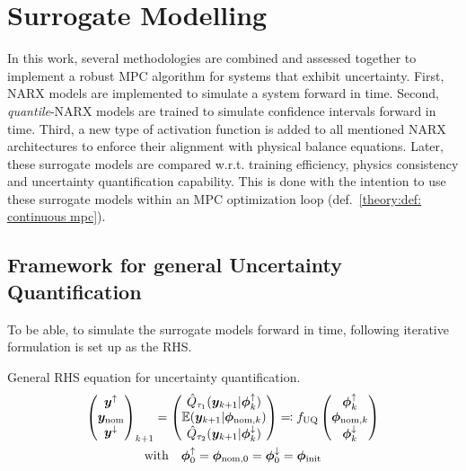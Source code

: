 \chapter{Surrogate Modelling}

In this work, several methodologies are combined and assessed together to implement a robust MPC algorithm
for systems that exhibit uncertainty. First, NARX models are implemented to simulate a system forward in time.
Second, \emph{quantile}-NARX models are trained to simulate confidence intervals forward in time. Third,
a new type of activation function is added to all mentioned NARX architectures to enforce their alignment
with physical balance equations. Later, these surrogate models are compared w.r.t. training efficiency,
physics consistency and uncertainty quantification capability. 
This is done with the intention to use these surrogate models within an MPC optimization
loop (def.~\ref{theory:def: continuous mpc}).

\section{Framework for general Uncertainty Quantification}
To be able, to simulate the surrogate models forward in time, following iterative formulation 
is set up as the RHS.
\begin{definition} General RHS equation for uncertainty quantification.
    \label{sur:def: general rhs for uncertainty quantification}
    \[  
    \begin{gathered}
        \begin{pmatrix}
            {\bm{y}}^\uparrow \\
            {\bm{y}}_\text{nom} \\
            {\bm{y}}^\downarrow
        \end{pmatrix}_{k+1}
        = \begin{pmatrix}
            \hat{Q}_{\tau_1}({\bm{y}}_{k+1} | \bm{\phi}^\uparrow_k) \\
            \mathbb{E}({\bm{y}}_{k+1} | \bm{\phi}_{\text{nom},k}) \\
            \hat{Q}_{\tau_2}({\bm{y}}_{k+1} | \bm{\phi}^\downarrow_k)
        \end{pmatrix}
        \eqcolon f_\text{UQ}
        \begin{pmatrix}
            \bm{\phi}^\uparrow_k \\
            \bm{\phi}_{\text{nom},k} \\
            \bm{\phi}^\downarrow_k
        \end{pmatrix} \\
        \text{with} \quad \bm{\phi}^\uparrow_0 = \bm{\phi}_{\text{nom},0} = \bm{\phi}^\downarrow_0 = \bm{\phi}_\text{init}
    \end{gathered}
    \]
\end{definition}

